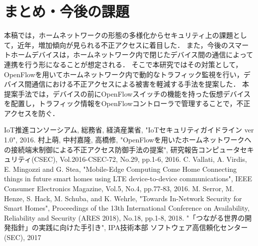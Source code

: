 \documentclass[a4paper,10pt,twocolumn,uplatex]{jsarticle}
\begin{document}
\section{まとめ・今後の課題}
本稿では，ホームネットワークの形態の多様化からセキュリティ上の課題として，近年，増加傾向が見られる不正アクセスに着目した．
また，今後のスマートホームデバイスは，ホームネットワーク内で閉じたデバイス間の通信によって連携を行う形になることが想定される．
そこで本研究ではその対策として，OpenFlowを用いてホームネットワーク内で動的なトラフィック監視を行い，デバイス間通信における不正アクセスによる被害を軽減する手法を提案した．
本提案手法では，デバイスの前にOpenFlowスイッチの機能を持った仮想デバイスを配置し，トラフィック情報をOpenFlowコントローラで管理することで，不正アクセスを防ぐ．

\footnotesize{
  \begin{thebibliography}{99}
     IoT推進コンソーシアム, 総務省, 経済産業省, "IoTセキュリティガイドライン ver 1.0", 2016.
     村上萌, 中村嘉隆, 高橋修, "OpenFlowを用いたホームネットワークへの接続端末制御による不正アクセス防御手法の提案", 研究報告コンピュータセキュリティ(CSEC), Vol.2016-CSEC-72, No.29, pp.1-6, 2016.
     C. Vallati, A. Virdis, E. Mingozzi and G. Stea, "Mobile-Edge Computing Come Home Connecting things in future smart homes using LTE device-to-device communications", IEEE Consumer Electronics Magazine, Vol.5, No.4, pp.77-83, 2016.
     M. Serror, M. Henze, S. Hack, M. Schuba, and K. Wehrle, "Towards In-Network Security for Smart Homes", Proceedings of the 13th International Conference on Availability, Reliability and Security (ARES 2018), No.18, pp.1-8, 2018.
     "「つながる世界の開発指針」の実践に向けた手引き", IPA技術本部 ソフトウェア高信頼化センター(SEC), 2017
  \end{thebibliography}
}

\end{document}
